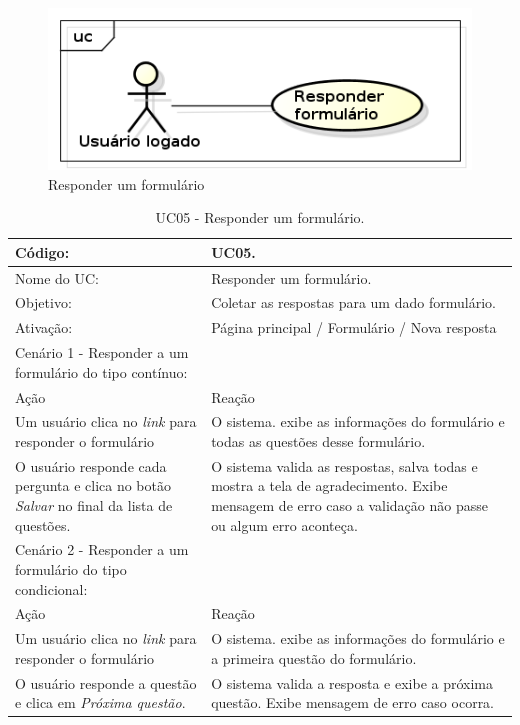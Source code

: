 \documentclass[11pt]{article}
\begin{document}
        \begin{figure}[h!]
          \centering
          \includegraphics[width=.5\textwidth]{responder.png}
          \caption{Responder um formulário}
        \end{figure}

        \begin{table}[h]
          \begin{center}
            \begin{tabular}{ | p{7cm} | p{8cm} | }
              \hline
              Código: \cellcolor{gray} & UC05. \\
              \hline
              Nome do UC: \cellcolor{gray} & Responder um formulário. \\
              \hline
              Objetivo: \cellcolor{gray} & Coletar as respostas para um dado formulário. \\
              \hline
              Ativação: \cellcolor{gray} & Página principal / Formulário / Nova resposta \\
              \hline
              \hline
              Cenário 1 - Responder a um formulário do tipo contínuo: &  \\
              \hline
              Ação\cellcolor{gray} & Reação\cellcolor{gray} \\
              \hline
              Um usuário clica no {\em link} para responder o formulário & O sistema. exibe as informações do formulário e todas as questões desse formulário. \\
              \hline
              O usuário responde cada pergunta e clica no botão {\em Salvar} no final da lista de questões. & O sistema valida as respostas, salva todas e mostra a tela de agradecimento. Exibe mensagem de erro caso a validação não passe ou algum erro aconteça. \\
              \hline
              \hline              
              Cenário 2 - Responder a um formulário do tipo condicional: &  \\
              \hline
              Ação\cellcolor{gray} & Reação\cellcolor{gray} \\
              \hline
              Um usuário clica no {\em link} para responder o formulário & O sistema. exibe as informações do formulário e a primeira questão do formulário. \\
              \hline
              O usuário responde a questão e clica em {\em Próxima questão}. & O sistema valida a resposta e exibe a próxima questão. Exibe mensagem de erro caso ocorra. \\
              \hline
            \end{tabular}
            \caption{UC05 - Responder um formulário.}
          \end{center}
        \end{table}
\end{document}
